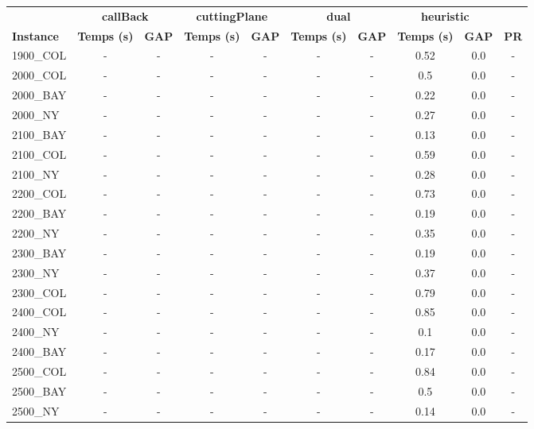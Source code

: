 \documentclass[main.tex]{subfiles}
\begin{document}
\begin{center}
\renewcommand{\arraystretch}{1.4} 
 \begin{tabular}{lccccccccc}
	\hline
 & \multicolumn{2}{c}{\textbf{callBack}} & \multicolumn{2}{c}{\textbf{cuttingPlane}} & \multicolumn{2}{c}{\textbf{dual}} & \multicolumn{2}{c}{\textbf{heuristic}}\\
\textbf{Instance}  & \textbf{Temps (s)} & \textbf{GAP} & \textbf{Temps (s)} & \textbf{GAP} & \textbf{Temps (s)} & \textbf{GAP} & \textbf{Temps (s)} & \textbf{GAP} & \textbf{PR} \\\hline

1900\_COL & - & - 
 & - & - 
 & - & - 
 & 0.52 & 0.0 & - \\
2000\_COL & - & - 
 & - & - 
 & - & - 
 & 0.5 & 0.0 & - \\
2000\_BAY & - & - 
 & - & - 
 & - & - 
 & 0.22 & 0.0 & - \\
2000\_NY & - & - 
 & - & - 
 & - & - 
 & 0.27 & 0.0 & - \\
2100\_BAY & - & - 
 & - & - 
 & - & - 
 & 0.13 & 0.0 & - \\
2100\_COL & - & - 
 & - & - 
 & - & - 
 & 0.59 & 0.0 & - \\
2100\_NY & - & - 
 & - & - 
 & - & - 
 & 0.28 & 0.0 & - \\
2200\_COL & - & - 
 & - & - 
 & - & - 
 & 0.73 & 0.0 & - \\
2200\_BAY & - & - 
 & - & - 
 & - & - 
 & 0.19 & 0.0 & - \\
2200\_NY & - & - 
 & - & - 
 & - & - 
 & 0.35 & 0.0 & - \\
2300\_BAY & - & - 
 & - & - 
 & - & - 
 & 0.19 & 0.0 & - \\
2300\_NY & - & - 
 & - & - 
 & - & - 
 & 0.37 & 0.0 & - \\
2300\_COL & - & - 
 & - & - 
 & - & - 
 & 0.79 & 0.0 & - \\
2400\_COL & - & - 
 & - & - 
 & - & - 
 & 0.85 & 0.0 & - \\
2400\_NY & - & - 
 & - & - 
 & - & - 
 & 0.1 & 0.0 & - \\
2400\_BAY & - & - 
 & - & - 
 & - & - 
 & 0.17 & 0.0 & - \\
2500\_COL & - & - 
 & - & - 
 & - & - 
 & 0.84 & 0.0 & - \\
2500\_BAY & - & - 
 & - & - 
 & - & - 
 & 0.5 & 0.0 & - \\
2500\_NY & - & - 
 & - & - 
 & - & - 
 & 0.14 & 0.0 & - \\
\hline\end{tabular}
\end{center}
\end{document}
